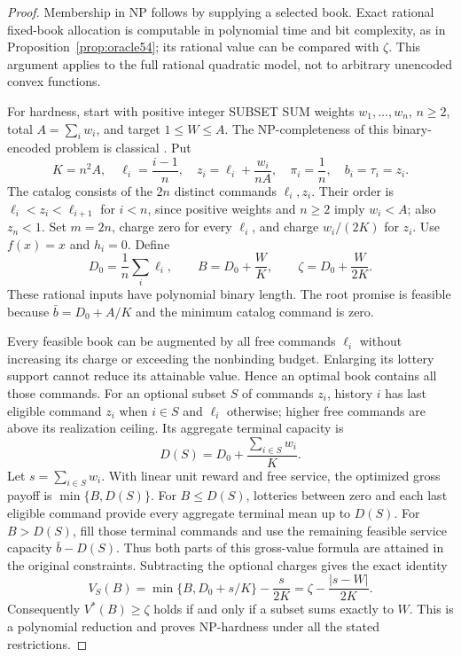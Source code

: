 \documentclass[11pt,letterpaper]{article}
\theoremstyle{definition}\newtheorem{remark}[theorem]{Remark}
\begin{document}
\begin{proof}
Membership in NP follows by supplying a selected book. Exact rational fixed-book allocation is computable in polynomial time and bit complexity, as in Proposition~\ref{prop:oracle54}; its rational value can be compared with $\zeta$. This argument applies to the full rational quadratic model, not to arbitrary unencoded convex functions.

For hardness, start with positive integer SUBSET SUM weights $w_1,\ldots,w_n$, $n\geq2$, total $A=\sum_iw_i$, and target $1\leq W\leq A$. The NP-completeness of this binary-encoded problem is classical \citep{Karp1972}. Put
\begin{equation}\label{eq:reduction54}
 K=n^2A,\quad \ell_i=\frac{i-1}{n},\quad z_i=\ell_i+\frac{w_i}{nA},\quad
 \pi_i=\frac1n,\quad b_i=\tau_i=z_i.
\end{equation}
The catalog consists of the $2n$ distinct commands $\ell_i,z_i$. Their order is $\ell_i<z_i<\ell_{i+1}$ for $i<n$, since positive weights and $n\geq2$ imply $w_i<A$; also $z_n<1$. Set $m=2n$, charge zero for every $\ell_i$, and charge $w_i/(2K)$ for $z_i$. Use $f(x)=x$ and $h_i=0$. Define
\begin{equation}\label{eq:targetreduction54}
 D_0=\frac1n\sum_i\ell_i,\qquad B=D_0+\frac WK,
 \qquad \zeta=D_0+\frac W{2K}.
\end{equation}
These rational inputs have polynomial binary length. The root promise is feasible because $\bar b=D_0+A/K$ and the minimum catalog command is zero.

Every feasible book can be augmented by all free commands $\ell_i$ without increasing its charge or exceeding the nonbinding budget. Enlarging its lottery support cannot reduce its attainable value. Hence an optimal book contains all those commands. For an optional subset $S$ of commands $z_i$, history $i$ has last eligible command $z_i$ when $i\in S$ and $\ell_i$ otherwise; higher free commands are above its realization ceiling. Its aggregate terminal capacity is
\[
 D(S)=D_0+\frac{\sum_{i\in S}w_i}{K}.
\]
Let $s=\sum_{i\in S}w_i$. With linear unit reward and free service, the optimized gross payoff is $\min\{B,D(S)\}$. For $B\leq D(S)$, lotteries between zero and each last eligible command provide every aggregate terminal mean up to $D(S)$. For $B>D(S)$, fill those terminal commands and use the remaining feasible service capacity $\bar b-D(S)$. Thus both parts of this gross-value formula are attained in the original constraints. Subtracting the optional charges gives the exact identity
\begin{equation}\label{eq:distance54}
 V_S(B)=\min\{B,D_0+s/K\}-\frac{s}{2K}
       =\zeta-\frac{|s-W|}{2K}.
\end{equation}
Consequently $V^*(B)\geq\zeta$ holds if and only if a subset sums exactly to $W$. This is a polynomial reduction and proves NP-hardness under all the stated restrictions.
\end{proof}
\end{document}
